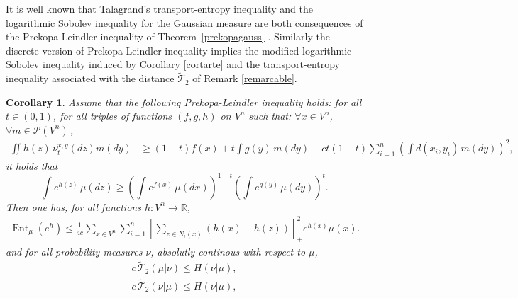 \documentclass[11pt]{amsart}
\newtheorem{cor}[equation]{Corollary}
\numberwithin{equation}{section}
\begin{document}
It is well known that  Talagrand's transport-entropy  inequality and the logarithmic Sobolev inequality for the Gaussian measure are both consequences of the Prekopa-Leindler inequality of Theorem~\ref{prekopagauss} \cite{bobkov-ledoux00}.  
Similarly the  discrete version of  Prekopa Leindler inequality implies the modified logarithmic Sobolev inequality induced by Corollary \ref{cortarte} and the   transport-entropy inequality associated with the distance ${\widetilde{\mathcal{T}}}_2$ of Remark \ref{remarcable}.
\begin{cor}\label{rrrouf}
Assume that the following Prekopa-Leindler inequality holds: for all $t\in (0,1)$, for all  triples of functions $(f,g,h)$ on $V^n$ such that:  $\forall x\in V^n$, $\forall m\in \mathcal{P}(V^n)$\,,
\begin{align*} \label{hyppl2}
\iint h(z) \,\nu_t^{x,y}(dz) m(dy)  
& \geq 
(1-t)f(x) + t \int g (y)\,m(dy) 
-ct(1-t) \sum_{i=1}^n \left(\int d(x_i,y_i)\,m(dy)\right)^2,
\end{align*}
 it holds that
$$
\int e^{h(z)}\,\mu(dz) \geq \left( \int e^{f(x)}\,\mu(dx) \right)^{1-t} \left( \int e^{g(y)} \,\mu(dy) \right)^t  .
$$
Then one has, for all functions $h \colon V^n \to \mathbb{R}$,
\begin{eqnarray*}
{\operatorname{Ent}}_\mu(e^h)\leq \frac{1}{4c} \sum_{x\in V^n} \sum_{i=1}^n \left[\sum_{z\in N_i(x)} \left(h(x) - h(z)  \right)\right]_{+}^2e^{h(x)}\mu(x).
\end{eqnarray*}
and for all probability measures $\nu$, absolutly continous with respect to $\mu$,
\begin{eqnarray}\label{transporttilde1}
c\,{\widetilde{\mathcal{T}}}_2(\mu|\nu)\leq H(\nu|\mu),
\end{eqnarray}
\begin{eqnarray}\label{transporttilde2}
c\,{\widetilde{\mathcal{T}}}_2(\nu|\mu)\leq H(\nu|\mu),
\end{eqnarray}
\end{cor}
\end{document}
